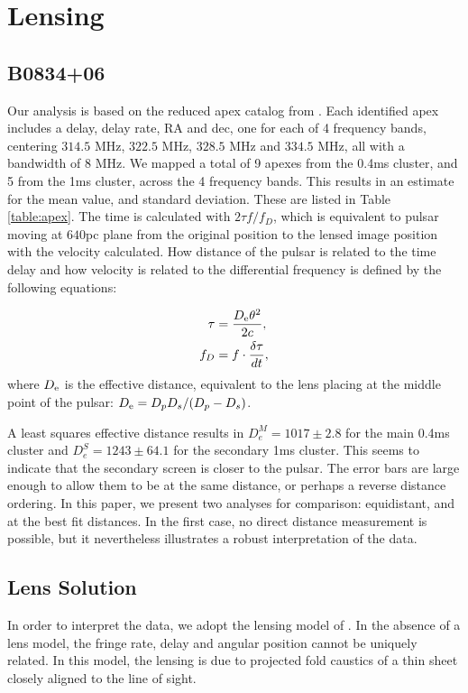 \documentclass[useAMS,usenatbib]{mn2e}
\begin{document}
\section{Lensing}
\subsection{B0834+06}

Our analysis is based on the reduced apex catalog from
\citet{2010ApJ...708..232B}. Each identified apex includes a delay,
delay rate, RA and dec, one for each of 4 frequency bands, centering $314.5$ MHz, $322.5$ MHz, $328.5$ MHz and $334.5$ MHz, all with a bandwidth of $8$ MHz.  We mapped
a total of 9 apexes from the 0.4ms cluster, and 5 from the 1ms
cluster, across the 4 frequency bands. This results in an estimate
for the mean value, and standard deviation.  These are listed in Table
\ref{table:apex}. The time is calculated with $2{\tau}f/{f_{D}}$,
which is equivalent to pulsar moving at $640$pc plane from the
original position to the lensed image position with the velocity
calculated. How distance of the pulsar is related to the time delay and how velocity is related to the differential frequency is defined by the following equations:

\begin{align*}
\tau &=\frac{D_{\rm e}{\theta}^2}{2c}, \\
f_D  &=f\cdot\frac{\delta\tau}{dt},
\end{align*} 
where ${D_{\rm e}}$ is the effective distance, equivalent to the lens placing at the middle point of the pulsar: $D_{\rm e}={D_p D_s}/({D_p - D_s})$. 

A least squares effective distance results in
$D_e^M=1017\pm 2.8$ for the main 0.4ms cluster and
$D_e^S = 1243 \pm 64.1$ for the secondary 1ms cluster. This seems to
indicate that the secondary screen is closer to the pulsar. The error
bars are large enough to allow them to be at the same distance, or
perhaps a reverse distance ordering.  In this paper, we present two
analyses for comparison: equidistant, and at the best fit distances.
In the first case, no direct distance measurement is possible, but it
nevertheless illustrates a robust interpretation of the data.


\subsection{Lens Solution}

In order to interpret the data, we adopt the lensing model of
\citet{2014MNRAS.442.3338P}.  In the absence of a lens model, the
fringe rate, delay and angular position cannot be uniquely related. In
this model, the lensing is due to projected fold caustics of a thin
sheet closely aligned to the line of sight.
\end{document}
